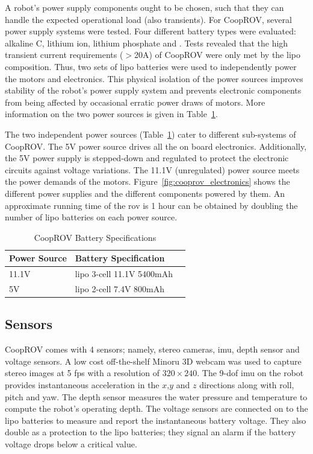 \documentclass {udthesis}
\begin{document}
A robot's power supply components ought to be chosen, such that they can handle the expected operational load (also transients). For CoopROV, several power supply systems were tested. Four different battery types were evaluated: alkaline C, lithium ion, lithium phosphate and . Tests revealed that the high transient current requirements ($>$20A) of CoopROV were only met by the \gls{lipo} composition. Thus, two sets of \gls{lipo} batteries were used to independently power the motors and electronics. This physical isolation of the power sources improves stability of the robot's power supply system and prevents electronic components from being affected by occasional erratic power draws of motors. More information on the two power sources is given in Table~\ref{tab:cooprov_battery}.

The two independent power sources (Table~\ref{tab:cooprov_battery}) cater to different sub-systems of CoopROV. The 5V power source drives all the on board electronics. Additionally, the 5V power supply is stepped-down and regulated to protect the electronic circuits against voltage variations.  The 11.1V  (unregulated) power source meets the power demands of the motors. Figure~\ref{fig:cooprov_electronics} shows the different power supplies  and the different components powered by them. An approximate running time of the \gls{rov} is 1 hour 
can be obtained by doubling the number of \gls{lipo} batteries on each power source.
%
\begin{table}
\centering
\caption{CoopROV Battery Specifications}
  \begin{tabular}{lll} 
  \toprule
  Power Source	&Battery Specification\\
  \midrule
  11.1V	&\gls{lipo} 3-cell 11.1V 5400mAh\\
  5V	&\gls{lipo} 2-cell 7.4V 800mAh\\
  \bottomrule
  \end{tabular}
  \label{tab:cooprov_battery}
\end{table}


\subsection{Sensors}

CoopROV comes with 4 sensors; namely, stereo cameras, \gls{imu}, depth sensor and voltage sensors. A low cost off-the-shelf Minoru 3D webcam \cite{minoru} was used to capture stereo images at 5 \gls{fps} with a resolution of $320\times 240$. The 9-\gls{dof} \gls{imu} on the robot provides instantaneous acceleration in the $x$,$y$ and $z$ directions along with roll, pitch and yaw. The depth sensor measures the water pressure and temperature to compute the robot's operating depth. The voltage sensors are connected on to the \gls{lipo} batteries to measure and report the instantaneous battery voltage. They also double as a protection to the \gls{lipo} batteries; they signal an alarm if the battery voltage drops below a critical value.
\end{document}
